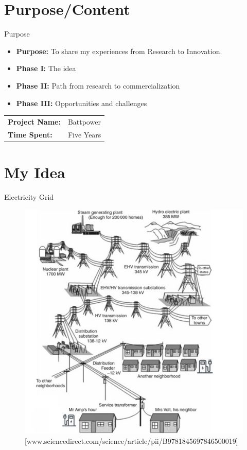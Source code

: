 \documentclass[12pt]{beamer}
\begin{document}
\begin{frame}
\titlepage
\end{frame}




\section{Purpose/Content}
\begin{frame}{Purpose}
\begin{itemize}
\item \textbf{Purpose:} To share my  experiences from Research to Innovation. 
\item \textbf{Phase I:} The idea
\item \textbf{Phase II:} Path from research to commercialization
\item \textbf{Phase III:} Opportunities and challenges
\end{itemize}
\begin{center}
\begin{tabular}{|l l|} 
\hline
\rowcolor{Gray} \textbf{Project Name:} &Battpower \\
\textbf{Time Spent:}& Five Years\\
\hline
\end{tabular}
\end{center}
\end{frame}

\section{My Idea}
\begin{frame}{Electricity Grid}
\begin{figure}[!htbp]
\centering
\includegraphics[width=2.8 in , height=2.4 in]{Figures/EVchalendge1.png}
\caption{\tiny[www.sciencedirect.com/science/article/pii/B9781845697846500019]}
\end{figure}
\end{frame}
\end{document}
